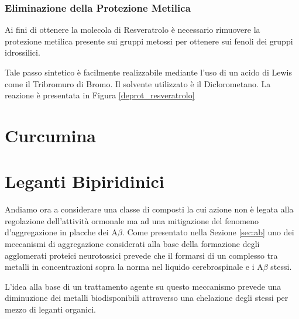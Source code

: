 \documentclass[a4paper, 12pt]{article}
\begin{document}
\subsubsection{Eliminazione della Protezione Metilica}
Ai fini di ottenere la molecola di Resveratrolo è necessario rimuovere la protezione metilica presente sui gruppi metossi per ottenere sui fenoli dei gruppi idrossilici.

Tale passo sintetico è facilmente realizzabile mediante l'uso di un acido di Lewis come il Tribromuro di Bromo. Il solvente utilizzato è il Diclorometano.
La reazione è presentata in Figura \ref{deprot_resveratrolo}

\section{Curcumina}
\label{sec:curc}

\section{Leganti Bipiridinici}
\label{sec:byp}
Andiamo ora a considerare una classe di composti la cui azione non è legata alla regolazione dell'attività ormonale ma ad una mitigazione del fenomeno d'aggregazione in placche dei A$\beta$. Come presentato nella Sezione \ref{sec:ab} uno dei meccanismi di aggregazione considerati alla base della formazione degli agglomerati proteici neurotossici prevede che il formarsi di un complesso tra metalli in concentrazioni sopra la norma nel liquido cerebrospinale e i A$\beta$ stessi.

L'idea alla base di un trattamento agente su questo meccanismo prevede una diminuzione dei metalli biodisponibili attraverso una chelazione degli stessi per mezzo di leganti organici.
\end{document}
